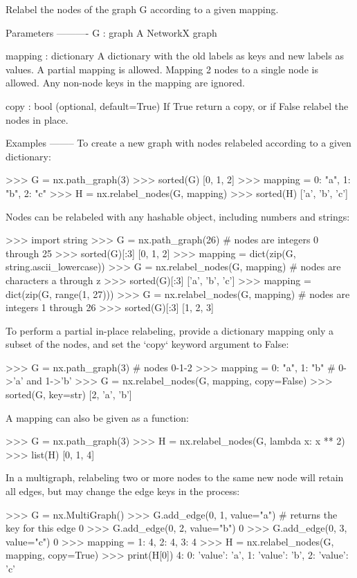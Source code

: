 \begin{DoxyVerb}Relabel the nodes of the graph G according to a given mapping.

Parameters
----------
G : graph
   A NetworkX graph

mapping : dictionary
   A dictionary with the old labels as keys and new labels as values.
   A partial mapping is allowed. Mapping 2 nodes to a single node is allowed.
   Any non-node keys in the mapping are ignored.

copy : bool (optional, default=True)
   If True return a copy, or if False relabel the nodes in place.

Examples
--------
To create a new graph with nodes relabeled according to a given
dictionary:

>>> G = nx.path_graph(3)
>>> sorted(G)
[0, 1, 2]
>>> mapping = {0: "a", 1: "b", 2: "c"}
>>> H = nx.relabel_nodes(G, mapping)
>>> sorted(H)
['a', 'b', 'c']

Nodes can be relabeled with any hashable object, including numbers
and strings:

>>> import string
>>> G = nx.path_graph(26)  # nodes are integers 0 through 25
>>> sorted(G)[:3]
[0, 1, 2]
>>> mapping = dict(zip(G, string.ascii_lowercase))
>>> G = nx.relabel_nodes(G, mapping)  # nodes are characters a through z
>>> sorted(G)[:3]
['a', 'b', 'c']
>>> mapping = dict(zip(G, range(1, 27)))
>>> G = nx.relabel_nodes(G, mapping)  # nodes are integers 1 through 26
>>> sorted(G)[:3]
[1, 2, 3]

To perform a partial in-place relabeling, provide a dictionary
mapping only a subset of the nodes, and set the `copy` keyword
argument to False:

>>> G = nx.path_graph(3)  # nodes 0-1-2
>>> mapping = {0: "a", 1: "b"}  # 0->'a' and 1->'b'
>>> G = nx.relabel_nodes(G, mapping, copy=False)
>>> sorted(G, key=str)
[2, 'a', 'b']

A mapping can also be given as a function:

>>> G = nx.path_graph(3)
>>> H = nx.relabel_nodes(G, lambda x: x ** 2)
>>> list(H)
[0, 1, 4]

In a multigraph, relabeling two or more nodes to the same new node
will retain all edges, but may change the edge keys in the process:

>>> G = nx.MultiGraph()
>>> G.add_edge(0, 1, value="a")  # returns the key for this edge
0
>>> G.add_edge(0, 2, value="b")
0
>>> G.add_edge(0, 3, value="c")
0
>>> mapping = {1: 4, 2: 4, 3: 4}
>>> H = nx.relabel_nodes(G, mapping, copy=True)
>>> print(H[0])
{4: {0: {'value': 'a'}, 1: {'value': 'b'}, 2: {'value': 'c'}}}


\end{DoxyVerb}

